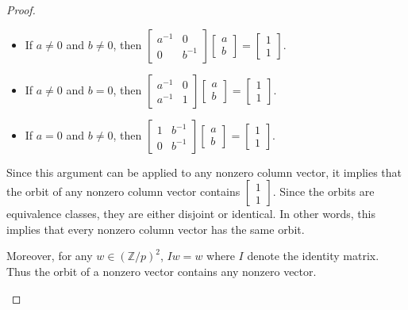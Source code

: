 \documentclass[12pt, psamsfonts]{amsart}
\theoremstyle{definition}
\theoremstyle{remark}
\numberwithin{equation}{section}
\begin{document}
\begin{proof}
\begin{itemize}
\begin{itemize}
          \begin{itemize}
            \item
              If $a \ne 0$ and $b \ne 0$, then $\begin{bmatrix} a^{-1} & 0 \\ 0 & b^{-1} \end{bmatrix}\begin{bmatrix} a \\ b \end{bmatrix} = \begin{bmatrix} 1 \\ 1 \end{bmatrix}$.
            \item
              If $a \ne 0$ and $b = 0$, then $\begin{bmatrix} a^{-1} & 0 \\ a^{-1} & 1 \end{bmatrix}\begin{bmatrix} a \\ b \end{bmatrix} = \begin{bmatrix} 1 \\ 1 \end{bmatrix}$.
            \item
              If $a = 0$ and $b \ne 0$, then $\begin{bmatrix} 1 & b^{-1} \\ 0 & b^{-1} \end{bmatrix}\begin{bmatrix} a \\ b \end{bmatrix} = \begin{bmatrix} 1 \\ 1 \end{bmatrix}$.
          \end{itemize}
          Since this argument can be applied to any nonzero column vector, it implies that the orbit of any nonzero column vector contains $\begin{bmatrix} 1 \\ 1 \end{bmatrix}$.
          Since the orbits are equivalence classes, they are either disjoint or identical.
          In other words, this implies that every nonzero column vector has the same orbit.

          Moreover, for any $w \in (\mathbb{Z}/p)^2$, $Iw = w$ where $I$ denote the identity matrix.
          Thus the orbit of a nonzero vector contains any nonzero vector.
          

\end{itemize}
\end{itemize}
\end{proof}
\end{document}
